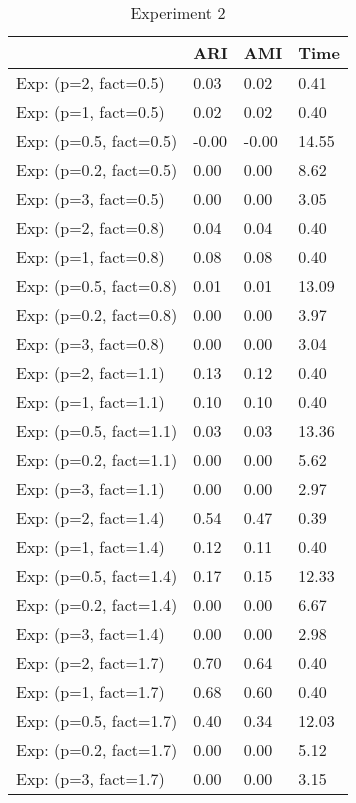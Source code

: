 \begin{table}
\centering
\caption{Experiment 2}
\begin{tabular}{llll}
\toprule
{} &    ARI &    AMI &   Time \\
\midrule
Exp: (p=2, fact=0.5)   &   0.03 &   0.02 &   0.41 \\
Exp: (p=1, fact=0.5)   &   0.02 &   0.02 &   0.40 \\
Exp: (p=0.5, fact=0.5) &  -0.00 &  -0.00 &  14.55 \\
Exp: (p=0.2, fact=0.5) &   0.00 &   0.00 &   8.62 \\
Exp: (p=3, fact=0.5)   &   0.00 &   0.00 &   3.05 \\
\midrule
Exp: (p=2, fact=0.8)   &   0.04 &   0.04 &   0.40 \\
Exp: (p=1, fact=0.8)   &   0.08 &   0.08 &   0.40 \\
Exp: (p=0.5, fact=0.8) &   0.01 &   0.01 &  13.09 \\
Exp: (p=0.2, fact=0.8) &   0.00 &   0.00 &   3.97 \\
Exp: (p=3, fact=0.8)   &   0.00 &   0.00 &   3.04 \\
\midrule
Exp: (p=2, fact=1.1)   &   0.13 &   0.12 &   0.40 \\
Exp: (p=1, fact=1.1)   &   0.10 &   0.10 &   0.40 \\
Exp: (p=0.5, fact=1.1) &   0.03 &   0.03 &  13.36 \\
Exp: (p=0.2, fact=1.1) &   0.00 &   0.00 &   5.62 \\
Exp: (p=3, fact=1.1)   &   0.00 &   0.00 &   2.97 \\
\midrule
Exp: (p=2, fact=1.4)   &   0.54 &   0.47 &   0.39 \\
Exp: (p=1, fact=1.4)   &   0.12 &   0.11 &   0.40 \\
Exp: (p=0.5, fact=1.4) &   0.17 &   0.15 &  12.33 \\
Exp: (p=0.2, fact=1.4) &   0.00 &   0.00 &   6.67 \\
Exp: (p=3, fact=1.4)   &   0.00 &   0.00 &   2.98 \\
\midrule
Exp: (p=2, fact=1.7)   &   0.70 &   0.64 &   0.40 \\
Exp: (p=1, fact=1.7)   &   0.68 &   0.60 &   0.40 \\
Exp: (p=0.5, fact=1.7) &   0.40 &   0.34 &  12.03 \\
Exp: (p=0.2, fact=1.7) &   0.00 &   0.00 &   5.12 \\
Exp: (p=3, fact=1.7)   &   0.00 &   0.00 &   3.15 \\

\end{tabular}
\end{table}
